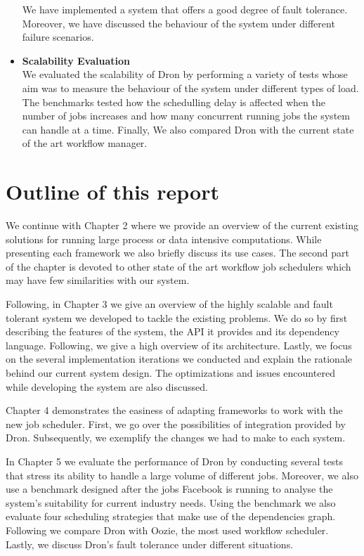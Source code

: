 \documentclass[11pt,a4paper,twoside]{report}
\begin{document}
\begin{itemize}
We have implemented a system that offers a good degree of fault tolerance. Moreover, we have discussed the behaviour of the system under different failure scenarios.
\item{}
\textbf{Scalability Evaluation}\\
We evaluated the scalability of Dron by performing a variety of tests whose aim was to measure the behaviour of the system under different types of load. The benchmarks tested how the schedulling delay is affected when the number of jobs increases and how many concurrent running jobs the system can handle at a time. Finally, We also compared Dron with the current state of the art workflow manager.
\end{itemize}

\section{Outline of this report}
We continue with Chapter 2 where we provide an overview of the current existing solutions for running large process or data intensive computations. While presenting each framework we also briefly discuss its use cases. The second part of the chapter is devoted to other state of the art workflow job schedulers which may have few similarities with our system.


Following, in Chapter 3 we give an overview of the highly scalable and fault tolerant system we developed to tackle the existing problems. We do so by first describing the features of the system, the API it provides and its dependency language. Following, we give a high overview of its architecture. Lastly, we focus on the several implementation iterations we conducted and explain the rationale behind our current system design. The optimizations and issues encountered while developing the system are also discussed.


Chapter 4 demonstrates the easiness of adapting frameworks to work with the new job scheduler. First, we go over the possibilities of integration provided by Dron. Subsequently, we exemplify the changes we had to make to each system.


In Chapter 5 we evaluate the performance of Dron by conducting several tests that stress its ability to handle a large volume of different jobs. Moreover, we also use a benchmark designed after the jobs Facebook is running to analyse the system's suitability for current industry needs. Using the benchmark we also evaluate four scheduling strategies that make use of the dependencies graph. Following we compare Dron with Oozie, the most used workflow scheduler. Lastly, we discuss Dron's fault tolerance under different situations.
\end{document}
